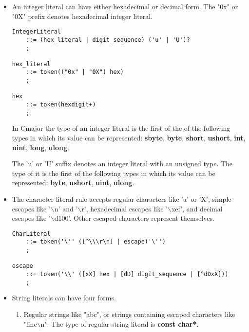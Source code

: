 \documentclass[a4paper,oneside,11pt]{book}
\theoremstyle{definition}
\begin{document}
\begin{itemize}
\item
An integer literal can have either hexadecimal or decimal form.
The "0x" or "0X" prefix denotes hexadecimal integer literal.

\begin{flushleft}
\begin{lstlisting}[language=cmpg,frame=trBL]
IntegerLiteral
    ::= (hex_literal | digit_sequence) ('u' | 'U')?
    ;

hex_literal
    ::= token(("0x" | "0X") hex)
    ;

hex
    ::= token(hexdigit+)
    ;
\end{lstlisting}
\end{flushleft}

In Cmajor the type of an integer literal is the first of the of the following types in which its value can be represented:
\textbf{sbyte}, \textbf{byte}, \textbf{short}, \textbf{ushort}, \textbf{int}, \textbf{uint}, \textbf{long}, \textbf{ulong}.

The 'u' or 'U' suffix denotes an integer literal with an unsigned type. The type of it is the first of the following types
in which its value can be represented: \textbf{byte}, \textbf{ushort}, \textbf{uint}, \textbf{ulong}.

\item
The character literal rule accepts regular characters like 'a' or 'X', simple escapes like '$\backslash$n' and '$\backslash$r',
hexadecimal escapes like '$\backslash$xef', and decimal escapes  like '$\backslash$d100'.
Other escaped characters represent themselves.

\begin{flushleft}
\begin{lstlisting}[language=cmpg,frame=trBL]
CharLiteral
    ::= token('\'' ([^\\\r\n] | escape)'\'')
    ;

escape
    ::= token('\\' ([xX] hex | [dD] digit_sequence | [^dDxX]))
    ;
\end{lstlisting}
\end{flushleft}

\item
String literals can have four forms.

\begin{enumerate}
\item
Regular strings like "abc", or strings containing escaped characters like "line$\backslash$n".
The type of regular string literal is \textbf{const char*}.


\end{enumerate}
\end{itemize}
\end{document}
